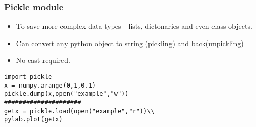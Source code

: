 \documentclass[xcolor=table,10pt, handout]{beamer}
\begin{document}







\begin{frame}[fragile]
\frametitle{Pickle module}
\begin{itemize}
\item To save more complex data types - lists, dictonaries and even class objects.     
\item Can convert any python object to string (pickling) and back(unpickling)  
\item No cast required. 
\end{itemize}

\vspace{1mm}
\begin{verbatim}
import pickle 
x = numpy.arange(0,1,0.1)
pickle.dump(x,open("example","w"))
#####################
getx = pickle.load(open("example","r"))\\
pylab.plot(getx) 
\end{verbatim}

\end{frame}

\end{document}
